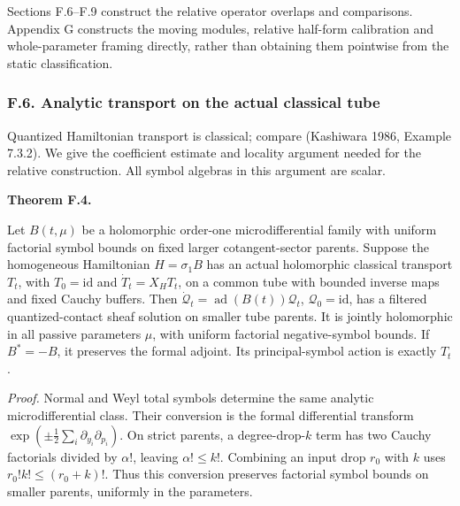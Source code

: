 \documentclass[
  english,
  11pt,
  reqno]{amsart}
\makeatletter
\newcommand{\pandocstatementheading}[1]{%
  \par\addpenalty{\@beginparpenalty}%
  \addvspace{.5\baselineskip plus .2\baselineskip minus .2\baselineskip}%
  {\normalfont\bfseries #1\par}%
  \nobreak\@afterindenttrue\@afterheading
}
\makeatother
\begin{document}
Sections F.6--F.9 construct the relative operator overlaps and
comparisons. Appendix G constructs the moving modules, relative
half-form calibration and whole-parameter framing directly, rather than
obtaining them pointwise from the static classification.

\protect{}\label{sec:gg-op-analytic-transport}

\subsubsection{F.6. Analytic transport on the actual classical
tube}\label{f.6.-analytic-transport-on-the-actual-classical-tube}

Quantized Hamiltonian transport is classical; compare (Kashiwara 1986,
Example 7.3.2). We give the coefficient estimate and locality argument
needed for the relative construction. All symbol algebras in this
argument are scalar.

\pandocstatementheading{\protect{}\label{thm:gg-op-analytic-transport}Theorem F.4.}

Let \(B(t,\mu)\) be a holomorphic order-one microdifferential family
with uniform factorial symbol bounds on fixed larger cotangent-sector
parents. Suppose the homogeneous Hamiltonian \(H=\sigma_1B\) has an
actual holomorphic classical transport \(T_t\), with \(T_0=\mathrm{id}\)
and \(\dot T_t=X_HT_t\), on a common tube with bounded inverse maps and
fixed Cauchy buffers. Then
\(\dot{\mathcal Q}_t=\operatorname{ad}(B(t))\mathcal Q_t\),
\(\mathcal Q_0=\mathrm{id}\), has a filtered quantized-contact sheaf
solution on smaller tube parents. It is jointly holomorphic in all
passive parameters \(\mu\), with uniform factorial negative-symbol
bounds. If \(B^*=-B\), it preserves the formal adjoint. Its
principal-symbol action is exactly \(T_t\).

\emph{Proof.} Normal and Weyl total symbols determine the same analytic
microdifferential class. Their conversion is the formal differential
transform \(\exp(\pm\frac12\sum_i\partial_{y_i}\partial_{p_i})\). On
strict parents, a degree-drop-\(k\) term has two Cauchy factorials
divided by \(\alpha!\), leaving \(\alpha!\le k!\). Combining an input
drop \(r_0\) with \(k\) uses \(r_0!k!\le(r_0+k)!\). Thus this conversion
preserves factorial symbol bounds on smaller parents, uniformly in the
parameters.
\end{document}
